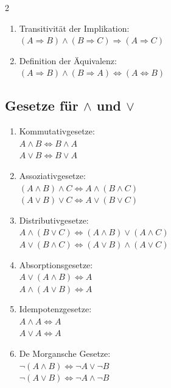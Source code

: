\documentclass[ngerman,11pt]{article}
\begin{document}
\begin{multicols}{2}
\begin{enumerate}[label=\arabic*., start=7]
\item Transitivität der Implikation:\\
$(A \Rightarrow B) \wedge (B \Rightarrow C) \Rightarrow (A \Rightarrow C)$

\item Definition der Äquivalenz:\\
$(A \Rightarrow B) \land (B \Rightarrow A) \Leftrightarrow (A \Leftrightarrow B)$
\end{enumerate}

\subsection*{Gesetze für $\wedge$ und $\vee$}

\begin{enumerate}[label=\arabic*., start=11]
\item Kommutativgesetze:\\
$A \wedge B \Leftrightarrow B \wedge A$\\
$A \vee B \Leftrightarrow B \vee A$

\item Assoziativgesetze:\\
$(A \wedge B) \wedge C \Leftrightarrow A \wedge (B \wedge C)$\\
$(A \vee B) \vee C \Leftrightarrow A \vee (B \vee C)$

\item Distributivgesetze:\\
$A \wedge (B \vee C) \Leftrightarrow (A \wedge B) \vee (A \wedge C)$\\
$A \vee (B \wedge C) \Leftrightarrow (A \vee B) \wedge (A \vee C)$

\item Absorptionsgesetze:\\
$A \vee (A \wedge B) \Leftrightarrow A$\\
$A \wedge (A \vee B) \Leftrightarrow A$

\item Idempotenzgesetze:\\
$A \wedge A \Leftrightarrow A$\\
$A \vee A \Leftrightarrow A$

\item De Morgansche Gesetze:\\
$\neg(A \wedge B) \Leftrightarrow \neg A \vee \neg B$\\
$\neg(A \vee B) \Leftrightarrow \neg A \wedge \neg B$
\end{enumerate}

\end{multicols}
\end{document}
